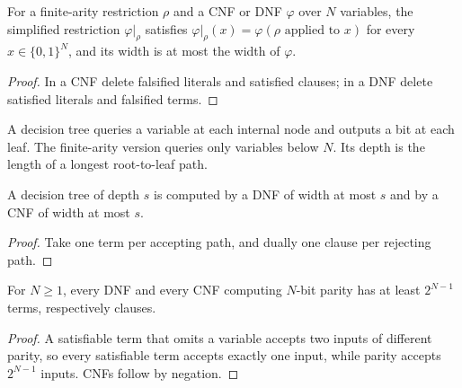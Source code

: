 \begin{lemma}
  \label{lem:lowerbounds-normal-form-restrict}
  \leanok
  For a finite-arity restriction $\rho$ and a CNF or DNF $\varphi$ over $N$
  variables, the simplified restriction $\varphi|_\rho$ satisfies
  $\varphi|_\rho(x) = \varphi(\rho \text{ applied to } x)$ for every
  $x \in \{0,1\}^N$, and its width is at most the width of $\varphi$.
\end{lemma}
\begin{proof}
  \leanok
  In a CNF delete falsified literals and satisfied clauses; in a DNF delete
  satisfied literals and falsified terms.
\end{proof}

\begin{definition}
  \label{def:lowerbounds-decision-tree}
  \leanok
  A decision tree queries a variable at each internal node and outputs a bit
  at each leaf. The finite-arity version queries only variables below $N$.
  Its depth is the length of a longest root-to-leaf path.
\end{definition}

\begin{lemma}
  \label{lem:lowerbounds-dt-normal-form}
  \leanok
  A decision tree of depth $s$ is computed by a DNF of width at most $s$ and
  by a CNF of width at most $s$.
\end{lemma}
\begin{proof}
  \leanok
  Take one term per accepting path, and dually one clause per rejecting path.
\end{proof}

\begin{theorem}
  \label{thm:lowerbounds-parity-depth-two}
  \leanok
  For $N \ge 1$, every DNF and every CNF computing $N$-bit parity has at
  least $2^{N-1}$ terms, respectively clauses.
\end{theorem}
\begin{proof}
  \leanok
  A satisfiable term that omits a variable accepts two inputs of different
  parity, so every satisfiable term accepts exactly one input, while parity
  accepts $2^{N-1}$ inputs. CNFs follow by negation.
\end{proof}

